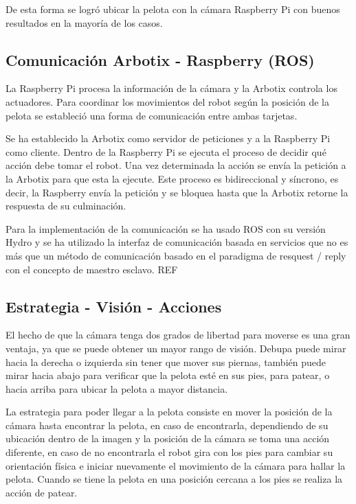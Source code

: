 De esta forma se logró ubicar la pelota con la cámara Raspberry Pi con buenos resultados en la mayoría de los casos. 
 
\subsection{Comunicación Arbotix - Raspberry (ROS)}

La Raspberry Pi procesa la información de la cámara y la Arbotix controla los actuadores. Para coordinar los movimientos del robot según la posición de la pelota se estableció una forma de comunicación entre ambas tarjetas. 

Se ha establecido la Arbotix como servidor de peticiones y a la Raspberry Pi como cliente. Dentro de la Raspberry Pi se ejecuta el proceso de decidir qué acción debe tomar el robot. Una vez determinada la acción se envía la petición a la Arbotix para que esta la ejecute. Este proceso es bidireccional y síncrono, es decir, la Raspberry envía la petición y se bloquea hasta que la Arbotix retorne la respuesta de su culminación.  

Para la implementación de la comunicación se ha usado ROS con su versión Hydro y se ha utilizado la interfaz de comunicación basada en servicios que no es más que un método de comunicación basado en el paradigma de resquest / reply con el concepto de maestro esclavo. REF

\subsection{Estrategia - Visión - Acciones}

El hecho de  que la cámara tenga dos grados de libertad para moverse es una gran ventaja, ya que se puede obtener un mayor rango de visión. Debupa puede mirar hacia la derecha o izquierda sin tener que mover sus piernas, también puede mirar hacia abajo para verificar que la pelota esté en sus pies, para patear, o hacia arriba para ubicar la pelota a mayor distancia.

La estrategia para poder llegar a la pelota consiste en mover la posición de la cámara hasta encontrar la pelota, en caso de encontrarla, dependiendo de su ubicación dentro de la imagen y la posición de la cámara se toma una acción diferente, en caso de no encontrarla el robot gira con los pies para cambiar su orientación física e iniciar nuevamente el movimiento de la cámara para hallar la pelota. Cuando se tiene la pelota en una posición cercana a los pies se realiza la acción de patear. 

